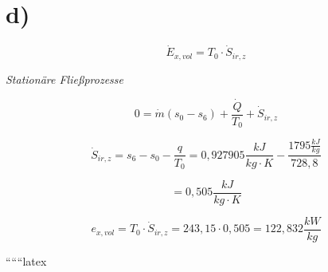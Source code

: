 

\section*{d)}

\[
\dot{E}_{x,vol} = T_0 \cdot \dot{S}_{ir,z}
\]

\textit{Stationäre Fließprozesse}

\[
0 = \dot{m} (s_0 - s_6) + \frac{\dot{Q}}{T_0} + \dot{S}_{ir,z}
\]

\[
\dot{S}_{ir,z} = s_6 - s_0 - \frac{q}{T_0} = 0,927905 \frac{kJ}{kg \cdot K} - \frac{1795 \frac{kJ}{kg}}{728,8}
\]

\[
= 0,505 \frac{kJ}{kg \cdot K}
\]

\[
e_{x,vol} = T_0 \cdot \dot{S}_{ir,z} = 243,15 \cdot 0,505 = 122,832 \frac{kW}{kg}
\]

``````latex